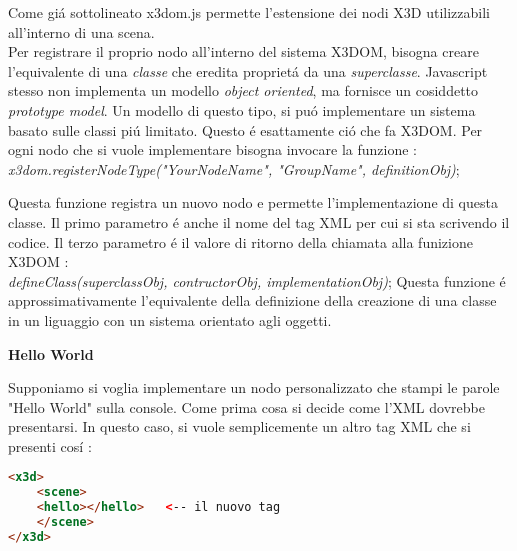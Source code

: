 \documentclass[11pt]{article}
\begin{document}
Come giá sottolineato x3dom.js permette l'estensione dei nodi X3D utilizzabili all'interno di una scena.\\ 
Per registrare il proprio nodo all'interno del sistema X3DOM, bisogna creare l'equivalente di una \textit{classe} che eredita proprietá da una \textit{superclasse}. 
Javascript stesso non implementa un modello \textit{object oriented}, ma fornisce un cosiddetto \textit{prototype model}. 
Un modello di questo tipo, si puó implementare un sistema basato sulle classi piú limitato. Questo é esattamente ció che fa X3DOM. 
\newline          
Per ogni nodo che si vuole implementare bisogna invocare la funzione :\\ 
\vspace{2mm}
\textit{x3dom.registerNodeType("YourNodeName", "GroupName", definitionObj)};
\vspace{2mm}
\newline

Questa funzione registra un nuovo nodo e permette l'implementazione di questa classe. Il primo parametro é anche il nome del tag XML per cui si sta scrivendo il codice. Il terzo parametro é il valore di ritorno della chiamata alla funizione X3DOM :\\ 
\vspace{2mm}
\textit{defineClass(superclassObj, contructorObj, implementationObj)};
\vspace{2mm}
\newline 
Questa funzione é approssimativamente l'equivalente della definizione della creazione di una classe in un liguaggio con un sistema orientato agli oggetti. \\ 

\begin{center}\textbf{Hello World} \end{center}

Supponiamo si voglia implementare un nodo personalizzato che stampi le parole "Hello World" sulla console. Come prima cosa si decide come l'XML dovrebbe presentarsi. In questo caso, si vuole semplicemente un altro tag XML che si presenti cosí : \\

\vspace{2mm}
\begin{lstlisting}[language=html] 
<x3d>
    <scene>
    <hello></hello>   <-- il nuovo tag
    </scene>
</x3d>
\end{lstlisting}
\vspace{2mm}
\end{document}
